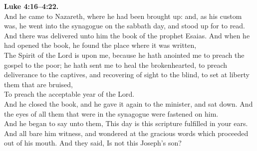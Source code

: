 \documentclass[10pt]{article} %
\begin{document}
{\begin{minipage}[t]{0.45\textwidth}
\textbf{Luke 4:16--4:22.}\\
And he came to Nazareth, where he had been brought up: and, as his custom was, he went into the synagogue on the sabbath day, and stood up for to read.\\
And there was delivered unto him the book of the prophet Esaias. And when he had opened the book, he found the place where it was written,\\
The Spirit of the Lord is upon me, because he hath anointed me to preach the gospel to the poor; he hath sent me to heal the brokenhearted, to preach deliverance to the captives, and recovering of sight to the blind, to set at liberty them that are bruised,\\
To preach the acceptable year of the Lord.\\
And he closed the book, and he gave it again to the minister, and sat down. And the eyes of all them that were in the synagogue were fastened on him.\\
And he began to say unto them, This day is this scripture fulfilled in your ears.\\
And all bare him witness, and wondered at the gracious words which proceeded out of his mouth. And they said, Is not this Joseph's son?\\

\end{minipage}}
\vspace*{\fill}
\newpage
\vspace*{\fill}
\vspace*{\fill}
\end{document}
